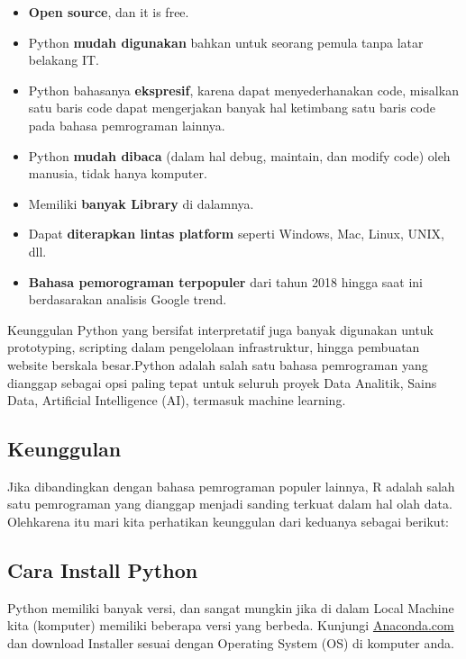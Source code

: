 \documentclass[
]{docs}
\providecommand{\tightlist}{%
  \setlength{\itemsep}{0pt}\setlength{\parskip}{0pt}}
\begin{document}
\begin{itemize}
\tightlist
\item
  \textbf{Open source}, dan it is free.
\item
  Python \textbf{mudah digunakan} bahkan untuk seorang pemula tanpa latar belakang IT.
\item
  Python bahasanya \textbf{ekspresif}, karena dapat menyederhanakan code, misalkan satu baris code dapat mengerjakan banyak hal ketimbang satu baris code pada bahasa pemrograman lainnya.
\item
  Python \textbf{mudah dibaca} (dalam hal debug, maintain, dan modify code) oleh manusia, tidak hanya komputer.
\item
  Memiliki \textbf{banyak Library} di dalamnya.
\item
  Dapat \textbf{diterapkan lintas platform} seperti Windows, Mac, Linux, UNIX, dll.
\item
  \textbf{Bahasa pemorograman terpopuler} dari tahun 2018 hingga saat ini berdasarakan analisis Google trend.
\end{itemize}

Keunggulan Python yang bersifat interpretatif juga banyak digunakan untuk prototyping, scripting dalam pengelolaan infrastruktur, hingga pembuatan website berskala besar.Python adalah salah satu bahasa pemrograman yang dianggap sebagai opsi paling tepat untuk seluruh proyek Data Analitik, Sains Data, Artificial Intelligence (AI), termasuk machine learning.

\hypertarget{keunggulan}{%
\subsection{Keunggulan}\label{keunggulan}}

Jika dibandingkan dengan bahasa pemrograman populer lainnya, R adalah salah satu pemrograman yang dianggap menjadi sanding terkuat dalam hal olah data. Olehkarena itu mari kita perhatikan keunggulan dari keduanya sebagai berikut:

\hypertarget{cara-install-python}{%
\subsection{Cara Install Python}\label{cara-install-python}}

Python memiliki banyak versi, dan sangat mungkin jika di dalam Local Machine kita (komputer) memiliki beberapa versi yang berbeda. Kunjungi \href{https://www.anaconda.com/products/distribution}{Anaconda.com} dan download Installer sesuai dengan Operating System (OS) di komputer anda.
\end{document}
